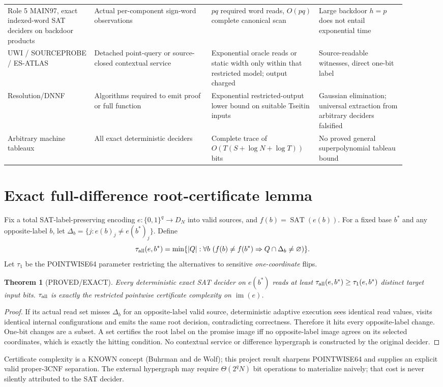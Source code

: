 \documentclass[10pt]{article}
\newtheorem{theorem}{Theorem}
\begin{document}
\begin{longtable}{p{0.205\linewidth}p{0.27\linewidth}p{0.235\linewidth}p{0.20\linewidth}}
Role 5 MAIN97, exact indexed-word SAT deciders on backdoor products & Actual per-component sign-word observations & $pq$ required word reads, $O(pq)$ complete canonical scan & Large backdoor $h=p$ does not entail exponential time\\
UWI / SOURCEPROBE / ES-ATLAS & Detached point-query or source-closed contextual service & Exponential oracle reads or static width only within that restricted model; output charged & Source-readable witnesses, direct one-bit label\\
Resolution/DNNF & Algorithms required to emit proof or full function & Exponential restricted-output lower bound on suitable Tseitin inputs & Gaussian elimination; universal extraction from arbitrary deciders falsified\\
Arbitrary machine tableaux & All exact deterministic deciders & Complete trace of $O(T(S+\log N+\log T))$ bits & No proved general superpolynomial tableau bound\\
\bottomrule
\end{longtable}

\section{Exact full-difference root-certificate lemma}
Fix a total SAT-label-preserving encoding $e:\{0,1\}^q\to D_N$ into valid sources, and $f(b)=\operatorname{SAT}(e(b))$. For a fixed base $b^*$ and any opposite-label $b$, let $\Delta_b=\{j:e(b)_j\ne e(b^*)_j\}$. Define
\[
\tau_{\rm all}(e,b^*)=\min\{|Q|:\forall b\ (f(b)\ne f(b^*)\Rightarrow Q\cap\Delta_b\ne\varnothing)\}.
\]
Let $\tau_1$ be the POINTWISE64 parameter restricting the alternatives to sensitive \emph{one-coordinate} flips.
\begin{theorem}[PROVED/EXACT]
Every deterministic exact SAT decider on $e(b^*)$ reads at least $\tau_{\rm all}(e,b^*)\ge\tau_1(e,b^*)$ distinct target input bits. $\tau_{\rm all}$ is exactly the restricted pointwise certificate complexity on $\operatorname{im}(e)$.
\end{theorem}
\begin{proof}
If its actual read set misses $\Delta_b$ for an opposite-label valid source, deterministic adaptive execution sees identical read values, visits identical internal configurations and emits the same root decision, contradicting correctness. Therefore it hits every opposite-label change. One-bit changes are a subset. A set certifies the root label on the promise image iff no opposite-label image agrees on its selected coordinates, which is exactly the hitting condition. No contextual service or difference hypergraph is constructed by the original decider.
\end{proof}
Certificate complexity is a KNOWN concept (Buhrman and de Wolf); this project result sharpens POINTWISE64 and supplies an explicit valid proper-3CNF separation. The external hypergraph may require $\Theta(2^qN)$ bit operations to materialize naively; that cost is never silently attributed to the SAT decider.
\end{document}
